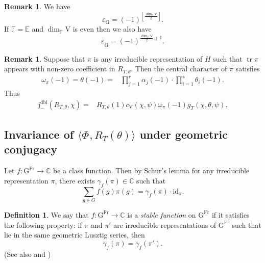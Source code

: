 \documentclass[12pt, reqno]{amsart}
\theoremstyle{definition}
\newtheorem{definition}[theorem]{Definition}
\theoremstyle{definition}
\newtheorem{remark}[theorem]{Remark}
\theoremstyle{definition}
\newcommand{\cComplex}{\mathbb{C}}
\newcommand{\idmap}{\mathrm{id}}
\newcommand{\hermitianSpace}{\mathrm{V}}
\newcommand{\fieldCharacter}{\psi}
\newcommand{\centralCharacter}[1]{\omega_{#1}}
\newcommand{\trace}{\operatorname{tr}}
\newcommand{\GroupExtension}[1]{\widetilde{#1}}
\newcommand{\finiteField}{\mathbb{F}}
\newcommand{\quadraticExtension}{\mathbb{E}}
\newcommand{\Frobenius}{\operatorname{Fr}}
\newcommand{\JacobiKernel}[1]{\Phi_{#1}}
\newcommand{\dblNegVirtualJacobiSumScalar}[2]{\mathrm{j}_{-}^{\mathrm{dbl}}\left(#1, #2\right)}
\newcommand{\algebraicGroup}[1]{\boldsymbol{\mathrm{#1}}}
\begin{document}
\begin{remark}
	We have $$\varepsilon_{\algebraicGroup{G}} = \left(-1\right)^{\left\lfloor \frac{\dim_{\finiteField} \hermitianSpace}{2}\right\rfloor}.$$ If $\finiteField = \quadraticExtension$ and $\dim_{\finiteField} \hermitianSpace$ is even then we also have $$\varepsilon_{\algebraicGroup{\GroupExtension{G}}} = \left(-1\right)^{\frac{\dim_{\finiteField} \hermitianSpace}{2} + 1}.$$
\end{remark}
\begin{remark}
	Suppose that $\pi$ is any irreducible representation of $H$ such that $\trace \pi$ appears with non-zero coefficient in $R_{T,\theta}$. Then the central character of $\pi$ satisfies
	\begin{align*}
		\centralCharacter{\pi}\left(-1\right) = \theta\left(-1\right) =& \prod_{j=1}^r \alpha_j\left(-1\right) \cdot \prod_{i=1}^s \theta_i\left(-1\right).
	\end{align*}
	Thus \begin{align*}
		\dblNegVirtualJacobiSumScalar{R_{T, \theta}}{\chi} =& R_{T,\theta}\left(1\right) c_{\hermitianSpace}\left(\chi, \fieldCharacter\right) \centralCharacter{\pi}\left(-1\right) g_T\left(\chi, \theta, \fieldCharacter\right).
	\end{align*}
\end{remark}

\subsection{Invariance of $\langle \JacobiKernel{}, R_T(\theta) \rangle$ under geometric conjugacy}

Let $f \colon \algebraicGroup{G}^{\Frobenius} \to \cComplex$ be a class function. Then by Schur's lemma for any irreducible representation $\pi$, there exists $\gamma_{f}\left(\pi\right) \in \cComplex$ such that $$\sum_{g \in G} f(g)\pi(g) = \gamma_{f}\left(\pi\right) \cdot \idmap_{\pi}.$$

\begin{definition}
	We say that  $f \colon \algebraicGroup{G}^{\Frobenius} \to \cComplex$ is a \emph{stable function} on $\algebraicGroup{G}^{\Frobenius}$ if it satisfies the following property: if $\pi$ and $\pi'$ are irreducible representations of $\algebraicGroup{G}^{\Frobenius}$ such that lie in the same geometric Lusztig series, then $$\gamma_{f}\left(\pi\right) = \gamma_{f}\left(\pi'\right).$$
(See also \cite[Section 4]{LaumonLetellier2023} and \cite[Section 4.1]{ChenBhattacharya2024})
	\end{definition}
\end{document}
